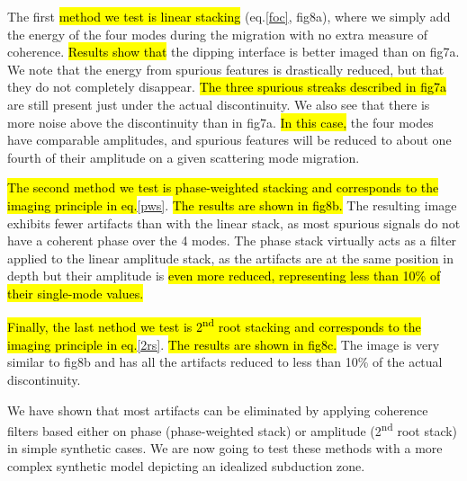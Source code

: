 \documentclass[10pt,a4paper]{article}
\begin{document}
The first \hl{method we test is linear stacking} (eq.\eqref{foc}, fig8a), where we simply add the energy of the four modes during the migration with no extra measure of coherence.
\hl{Results show that} the dipping interface is better imaged than on fig7a.
We note that the energy from spurious features is drastically reduced, but that they do not completely disappear.
\hl{The three spurious streaks described in fig7a} are still present just under the actual discontinuity.
We also see that there is more noise above the discontinuity than in fig7a.
\hl{In this case,} the four modes have comparable amplitudes, and spurious features will be reduced to about one fourth of their amplitude on a given scattering mode migration.

\hl{The second method we test is phase-weighted stacking and corresponds to the imaging principle in eq.}\eqref{pws}.
\hl{The results are shown in fig8b.}
The resulting image exhibits fewer artifacts than with the linear stack, as most spurious signals do not have a coherent phase over the 4 modes.
The phase stack virtually acts as a filter applied to the linear amplitude stack, as the artifacts are at the same position in depth but their amplitude is \hl{even more reduced, representing less than 10\% of their single-mode values.}

\hl{Finally, the last nethod we test is 2\textsuperscript{nd} root stacking and corresponds to the imaging principle in eq.}\eqref{2rs}.
\hl{The results are shown in fig8c.}
The image is very similar to fig8b and has all the artifacts reduced to less than 10\% of the actual discontinuity.

We have shown that most artifacts can be eliminated by applying coherence filters based either on phase (phase-weighted stack) or amplitude (2\textsuperscript{nd} root stack) in simple synthetic cases.
We are now going to test these methods with a more complex synthetic model depicting an idealized subduction zone.
\end{document}
